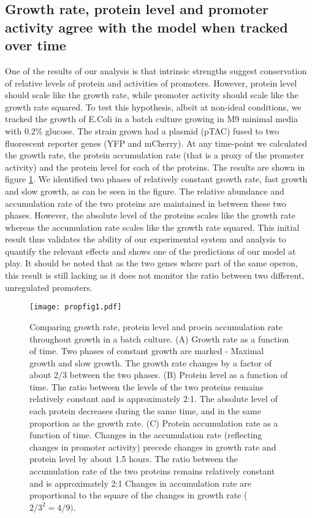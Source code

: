 \documentclass{report}
\begin{document}
\subsection{Growth rate, protein level and promoter activity agree with the model when tracked over time}
One of the results of our analysis is that intrinsic strengths suggest conservation of relative levels of protein and activities of promoters.
However, protein level should scale like the growth rate, while promoter activity should scale like the growth rate squared.
To test this hypothesis, albeit at non-ideal conditions, we tracked the growth of E.Coli in a batch culture growing in M9 minimal media with 0.2\% glucose.
The strain grown had a plasmid (pTAC) fused to two fluorescent reporter genes (YFP and mCherry).
At any time-point we calculated the growth rate, the protein accumulation rate (that is a proxy of the promoter activity) and the protein level for each of the proteins.
The results are shown in figure \ref{time-gr-fig}.
We identified two phases of relatively constant growth rate, fast growth and slow growth, as can be seen in the figure.
The relative abundance and accumulation rate of the two proteins are maintained in between these two phases.
However, the absolute level of the proteins scales like the growth rate whereas the accumulation rate scales like the growth rate squared.
This initial result thus validates the ability of our experimental system and analysis to quantify the relevant effects and shows one of the predictions of our model at play.
It should be noted that as the two genes where part of the same operon, this result is still lacking as it does not monitor the ratio between two different, unregulated promoters.
\begin{figure}[h]
\texttt{[image: propfig1.pdf]}
\caption{Comparing growth rate, protein level and proein accumulation rate throughout growth in a batch culture.
(A) Growth rate as a function of time.
Two phases of constant growth are marked - Maximal growth and slow growth.
The growth rate changes by a factor of about 2/3 between the two phases.
(B) Protein level as a function of time.
The ratio between the levels of the two proteins remains relatively constant and is approximately 2:1.
The absolute level of each protein decreases during the same time, and in the same proportion as the growth rate.
(C) Protein accumulation rate as a function of time.
Changes in the accumulation rate (reflecting changes in promoter activity) precede changes in growth rate and protein level by about 1.5 hours.
The ratio between the accumulation rate of the two proteins remains relatively constant and is approximately 2:1
Changes in accumulation rate are proportional to the square of the changes in growth rate ($2/3^2=4/9)$.}
\label{time-gr-fig}
\end{figure}
\end{document}
